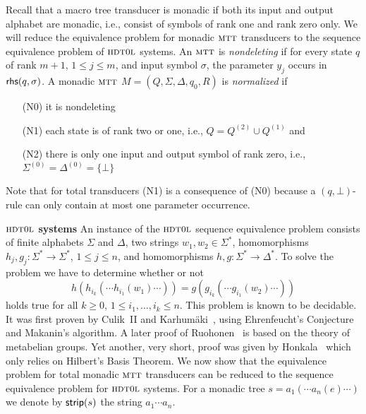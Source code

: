 \documentclass[copyright,creativecommons]{eptcs}
\newcommand{\mtt}{\textsc{mtt}}
\newcommand{\hdtol}{\textsc{hdt{\small 0}l}}
\def\strip{{\sf strip}}
\def\rhs{{\sf rhs}}
\begin{document}
Recall that a macro tree transducer is monadic if both its input 
and output alphabet are monadic, i.e., consist of symbols of
rank one and rank zero only.
We will reduce the equivalence problem for monadic $\mtt$ transducers
to the sequence equivalence problem of $\hdtol$ systems.
An $\mtt$ is \emph{nondeleting} if for every state $q$ of rank $m+1$,
$1\leq j\leq m$, and input symbol $\sigma$, the parameter $y_j$ occurs in $\rhs(q,\sigma)$.
A monadic $\mtt$ $M=(Q,\Sigma,\Delta,q_0,R)$ is \emph{normalized} if
\begin{enumerate}
\item[(N0)] it is nondeleting 
\item[(N1)] each state is of rank two or one, i.e., $Q=Q^{(2)}\cup Q^{(1)}$ and
\item[(N2)] there is only one input and output symbol of rank zero, i.e.,
$\Sigma^{(0)}=\Delta^{(0)}=\{\bot\}$
\end{enumerate}
Note that for total transducers (N1) is a consequence of (N0) because
a $(q,\bot)$-rule can only contain at most one parameter occurrence.

\medskip

{\bf $\hdtol$ systems}\quad
An instance of the $\hdtol$ sequence equivalence problem consists of finite
alphabets $\Sigma$ and $\Delta$, two strings $w_1,w_2\in\Sigma^*$,
homomorphisms $h_j,g_j:\Sigma^*\to\Sigma^*$, $1\leq j\leq n$, and
homomorphisms $h,g:\Sigma^*\to\Delta^*$. To solve the problem we have to determine
whether or not
\[
h(h_{i_k}(\cdots h_{i_1}(w_1)\cdots))=
g(g_{i_k}(\cdots g_{i_1}(w_2)\cdots))
\]
holds true for all $k\geq 0$, $1\leq i_1,\dots,i_k\leq n$.
This problem is known to be decidable. It was first proven 
by Culik~II and Karhum{\"a}ki~\cite{culkar86}, using Ehrenfeucht's Conjecture
and Makanin's algorithm. A later proof of Ruohonen~\cite{ruh86} is based
on the theory of metabelian groups. Yet another, very short, proof
was given by Honkala~\cite{DBLP:journals/tcs/Honkala00a} which only relies on Hilbert's Basis Theorem.
We now show that the equivalence problem for total monadic $\mtt$
transducers can be reduced to the sequence equivalence problem for $\hdtol$ systems. 
For a monadic tree $s=a_1(\cdots a_n(e)\cdots)$ we denote
by $\strip(s)$ the string $a_1\cdots a_n$. 
\end{document}

